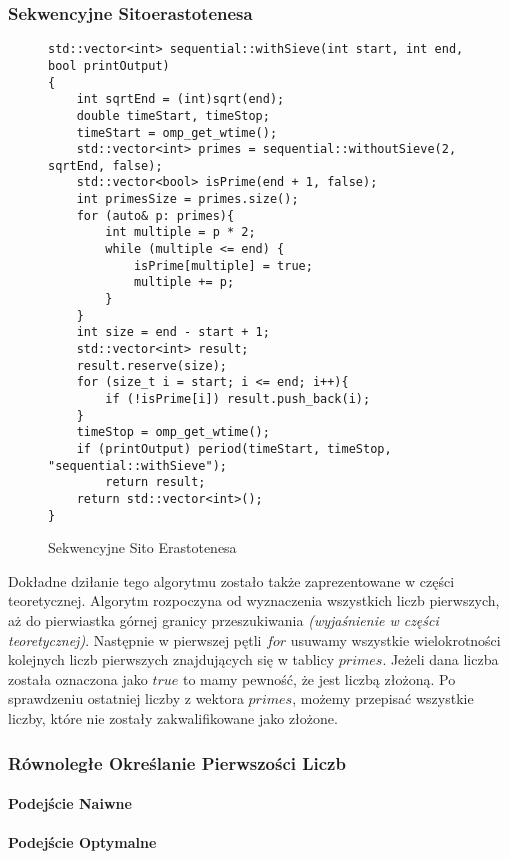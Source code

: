 \documentclass{article}
\begin{document}
            \subsubsection{Sekwencyjne Sitoerastotenesa}
                \begin{figure}
                    \begin{verbatim}
std::vector<int> sequential::withSieve(int start, int end, bool printOutput)
{
    int sqrtEnd = (int)sqrt(end);
    double timeStart, timeStop;
    timeStart = omp_get_wtime();
    std::vector<int> primes = sequential::withoutSieve(2, sqrtEnd, false);
    std::vector<bool> isPrime(end + 1, false);
    int primesSize = primes.size();
    for (auto& p: primes){
        int multiple = p * 2;
        while (multiple <= end) {
            isPrime[multiple] = true;
            multiple += p;
        }
    }
    int size = end - start + 1;
    std::vector<int> result;
    result.reserve(size);
    for (size_t i = start; i <= end; i++){
        if (!isPrime[i]) result.push_back(i);
    }
    timeStop = omp_get_wtime();
    if (printOutput) period(timeStart, timeStop, "sequential::withSieve");
        return result;
    return std::vector<int>();
}
                    \end{verbatim}
                    \caption{Sekwencyjne Sito Erastotenesa}
                \end{figure}
                Dokładne dziłanie tego algorytmu zostało także zaprezentowane w części teoretycznej. Algorytm rozpoczyna od wyznaczenia wszystkich liczb pierwszych, aż do pierwiastka górnej granicy przeszukiwania \emph{(wyjaśnienie w części teoretycznej)}. Następnie w pierwszej pętli $for$ usuwamy wszystkie wielokrotności kolejnych liczb pierwszych znajdujących się w tablicy $primes$. Jeżeli dana liczba została oznaczona jako $true$ to mamy pewność, że jest liczbą złożoną. Po sprawdzeniu ostatniej liczby z wektora $primes$, możemy przepisać wszystkie liczby, które nie zostały zakwalifikowane jako złożone.
                
            \subsubsection{Równoległe Określanie Pierwszości Liczb}
                \paragraph{Podejście Naiwne}
                \paragraph{Podejście Optymalne}
\end{document}
